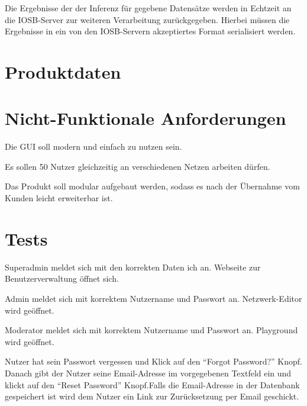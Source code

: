 \documentclass[parskip=full,11pt,twoside]{scrartcl}
\begin{document}
Die Ergebnisse der der Inferenz für gegebene Datensätze werden in Echtzeit an die IOSB-Server zur weiteren Verarbeitung zurückgegeben. Hierbei müssen die Ergebnisse in ein von den IOSB-Servern akzeptiertes Format serialisiert werden.

\section{Produktdaten}

\section{Nicht-Funktionale Anforderungen}


Die GUI soll modern und einfach zu nutzen sein.


Es sollen 50 Nutzer gleichzeitig an verschiedenen Netzen arbeiten dürfen. 


Das Produkt soll modular aufgebaut werden, sodass es nach der Übernahme vom Kunden leicht erweiterbar ist. 

\section{Tests}


{Superadmin meldet sich mit den korrekten Daten ich an. }
{Webseite zur Benutzerverwaltung öffnet sich.}

{Admin meldet sich mit korrektem Nutzername und Passwort an.}
{Netzwerk-Editor wird geöffnet.}

{Moderator meldet sich mit korrektem Nutzername und Passwort an.}
{Playground wird geöffnet.}

{Nutzer hat sein Passwort vergessen und Klick auf den \enquote{Forgot Password?} Knopf. Danach gibt der Nutzer seine Email-Adresse im vorgegebenen Textfeld ein und klickt auf den \enquote{Reset Password} Knopf.}{Falls die Email-Adresse in der Datenbank gespeichert ist wird dem Nutzer ein Link zur Zurücksetzung per Email geschickt.}
\end{document}
